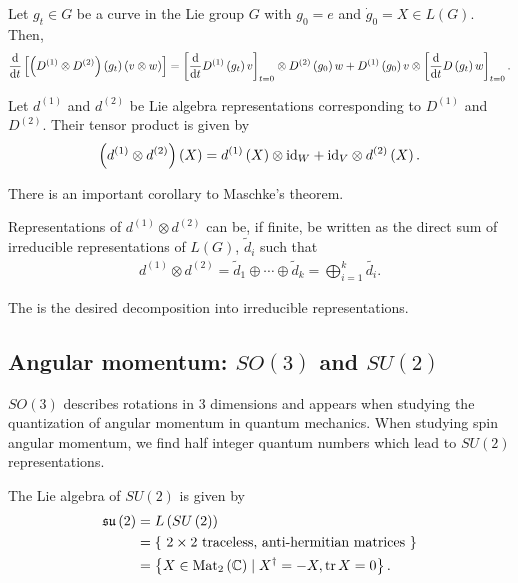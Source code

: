 Let $g_t \in G$ be a curve in the Lie group $G$ with $g_0 = e$ and $\dot{g}_0 = X \in L \left( G \right) $. Then,
\begin{align}
    \dv{t} \left[ \left( D^{\left( 1 \right) }\otimes D^{\left( 2 \right) } \right) \left( g_t \right) \left( v \otimes w \right)  \right] = \left[ \dv{t} D^{\left( 1 \right) }\left( g_t \right) v \right]_{t=0} \otimes D^{\left( 2 \right) }\left( g_0 \right)w  + D^{\left( 1 \right) }\left( g_0 \right) v \otimes \left[ \dv{t} D \left( g_t \right) w \right]_{t=0} 
.\end{align}

Let $d^{\left( 1 \right) }$ and $d^{\left( 2 \right) }$ be Lie algebra representations corresponding to $D^{\left( 1 \right) }$ and $D^{\left( 2 \right) }$. Their tensor product is given by
\begin{align}
    \left( d^{\left( 1 \right) } \otimes d^{\left( 2 \right) } \right) \left( X \right) = d^{\left( 1 \right) }\left( X \right)  \otimes \text{id}_W + \text{id}_V \otimes d^{\left( 2 \right) }\left( X \right) 
.\end{align}

There is an important corollary to Maschke's theorem.

\begin{corollary}
    Representations of $d^{\left( 1 \right) }\otimes d^{\left( 2 \right) }$ can be, if finite, be written as the direct sum of irreducible representations of $L\left( G \right) $, $\widetilde{d}_i$ such that
    \begin{align}
        d^{\left( 1 \right) } \otimes d^{\left( 2 \right)} = \widetilde{d}_1 \oplus \cdots \oplus \widetilde{d}_k = \bigoplus_{i=1}^{k} \widetilde{d_i}
    .\end{align}
\end{corollary}

The is the desired decomposition into irreducible representations.

\subsection{Angular momentum: $SO \left( 3 \right) $ and $SU \left( 2 \right) $}

$SO \left( 3 \right) $ describes rotations in 3 dimensions and appears when studying the quantization of angular momentum in quantum mechanics. When studying spin angular momentum, we find half integer quantum numbers which lead to $SU \left( 2 \right)$ representations.

The Lie algebra of $SU \left( 2 \right) $ is given by
\begin{align}
    \mathfrak{su} \left( 2 \right) &= L \left( SU \left( 2 \right)  \right)  \\
    &= \left\{ \text{~$2\times 2$ traceless, anti-hermitian matrices~} \right\}  \\
    &= \left\{ X \in \text{Mat}_{2} \left( \mathbb{C} \right)  \mid  X^{\dag} = - X, \tr X = 0 \right\} 
.\end{align}

